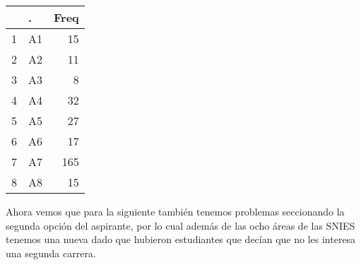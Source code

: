 \documentclass[
]{article}
\newenvironment{Shaded}{\begin{snugshade}}{\end{snugshade}}
\newcommand{\AttributeTok}[1]{\textcolor[rgb]{0.77,0.63,0.00}{#1}}
\newcommand{\CommentTok}[1]{\textcolor[rgb]{0.56,0.35,0.01}{\textit{#1}}}
\newcommand{\FunctionTok}[1]{\textcolor[rgb]{0.00,0.00,0.00}{#1}}
\newcommand{\NormalTok}[1]{#1}
\newcommand{\SpecialCharTok}[1]{\textcolor[rgb]{0.00,0.00,0.00}{#1}}
\begin{document}
\begin{Shaded}
\end{Shaded}

\begin{table}[ht]
\centering
\begin{tabular}{rlr}
  \hline
 & . & Freq \\ 
  \hline
1 & A1 &  15 \\ 
  2 & A2 &  11 \\ 
  3 & A3 &   8 \\ 
  4 & A4 &  32 \\ 
  5 & A5 &  27 \\ 
  6 & A6 &  17 \\ 
  7 & A7 & 165 \\ 
  8 & A8 &  15 \\ 
   \hline
\end{tabular}
\end{table}

Ahora vemos que para la siguiente también tenemos problemas seccionando
la segunda opción del aspirante, por lo cual además de las ocho áreas de
las SNIES tenemos una nueva dado que hubieron estudiantes que decían que
no les interesa una segunda carrera.
\end{document}
